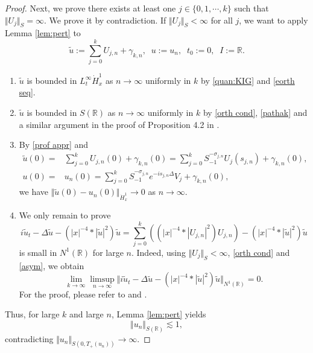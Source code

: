 \documentclass[reqno, 11pt]{amsart}
\numberwithin{equation}{section}
\newcommand{\R}{\mathbb{R}}
\theoremstyle{plain}
\theoremstyle{definition}
\numberwithin{equation}{section}
\numberwithin{theorem}{section}
\numberwithin{equation}{section}
\numberwithin{equation}{section}
\numberwithin{theorem}{section}
\begin{document}
\begin{proof}
		Next, we prove there exists at least one $j\in\{0,1,\cdots,k\}$ such that $\Vert U_j\Vert_S=\infty$. We prove it by contradiction. If $\Vert U_j\Vert_S<\infty$ for all $j$, we want to apply Lemma \ref{lem:pert} to 
		\begin{equation*}
		\widetilde{u}:=\sum_{j=0}^{k} U_{j,n}+\gamma_{k,n},\;\;u:=u_n,\;\;t_0:=0,\;\;I:=\R.
		\end{equation*}
		\begin{enumerate}
			\item[$(1)$] $\widetilde{u}$ is bounded in $L_{t}^{\infty}\dot H_x^1$ as $n\rightarrow \infty$ uniformly in $k$ by \eqref{quan:KIG} and \eqref{eorth seq}. 
			\item[$(2)$] $\widetilde{u}$ is bounded in $S(\R)$ as $n\rightarrow \infty$ uniformly in $k$ by \eqref{orth cond}, \eqref{pathak} and a similar argument in the proof of Proposition 4.2 in \cite{MXZ:crit Hart:f rad}.
			\item[$(3)$] By \eqref{prof appr} and
			\begin{equation*}
			\begin{aligned}
			\widetilde{u}(0)=&\sum_{j=0}^{k} U_{j,n}(0)+\gamma_{k,n}(0)=\sum_{j=0}^k S_{-1}^{-\sigma_{j,n}}U_j(s_{j,n}) +\gamma_{k,n}(0),\\u(0)=&u_n(0)=\sum_{j=0}^k S_{-1}^{-\sigma_{j,n}}e^{-is_{j,n}\Delta}V_j +\gamma_{k,n}(0),
			\end{aligned}
			\end{equation*}
			we have $\Vert \widetilde{u}(0)-u_n(0)\Vert_{\dot H_x^1}\rightarrow0$ as $n\rightarrow \infty$. 
			\item[$(4)$] We only remain to prove
			\begin{equation*}
			i\widetilde{u}_{t}- \Delta\widetilde{u}-\left( |x|^{-4}*|\widetilde{u}|^2\right)\widetilde{u}=\sum_{j=0}^{k}\left( \left( |x|^{-4}*|U_{j,n}|^2\right)U_{j,n} \right)-\left( |x|^{-4}*|\widetilde{u}|^2\right)\widetilde{u}
			\end{equation*}
			is small in $N^1(\R)$ for large $n$. Indeed, using $\Vert U_j\Vert_{S}<\infty$, \eqref{orth cond} and \eqref{asym}, we obtain
			\begin{equation*}
			\lim_{k \to \infty}\limsup_{n \to \infty}\Vert i\widetilde{u}_{t}- \Delta\widetilde{u}-\left( |x|^{-4}*|\widetilde{u}|^2\right)\widetilde{u} \Vert_{N^1(\R)}=0.
			\end{equation*}
			For the proof, please refer to \cite[Proposition 4.2]{MXZ:crit Hart:f rad} and \cite{Ker}. 
		\end{enumerate}
		Thus, for large $k$ and large $n$, Lemma \ref{lem:pert} yields 
		\begin{equation*}
		\Vert u_n\Vert_{S(\R)}\lesssim1,
		\end{equation*}
		contradicting $\Vert u_n\Vert_{S(0,T_+(u_n))}\rightarrow\infty$.
		

\end{proof}
\end{document}
